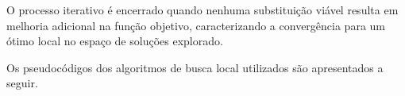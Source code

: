 O processo iterativo é encerrado quando nenhuma substituição viável resulta em melhoria adicional na função objetivo, caracterizando a 
convergência para um ótimo local no espaço de soluções explorado.

Os pseudocódigos dos algoritmos de busca local utilizados são apresentados a seguir.



\FloatBarrier